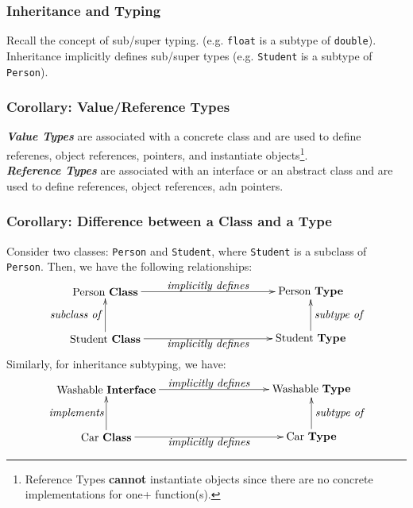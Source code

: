 \documentclass{article}
\begin{document}
\subsubsection{Inheritance and Typing}
Recall the concept of sub/super typing. (e.g. \texttt{float} is a
subtype of \texttt{double}). Inheritance implicitly defines sub/super
types (e.g. \texttt{Student} is a subtype of \texttt{Person}).

\subsubsection*{Corollary: Value/Reference Types}
\textit{\textbf{Value Types}} are associated with a concrete class and
are used to define referenes, object references, pointers, and
instantiate objects\footnote{Reference Types \textbf{cannot}
  instantiate objects since there are no concrete implementations for one+
  function(s).}. \\
\textit{\textbf{Reference Types}} are associated with an interface or
an abstract class and are used to define references, object
references, adn pointers.

\subsubsection*{Corollary: Difference between a Class and a Type}
Consider two classes: \texttt{Person} and \texttt{Student}, where
\texttt{Student} is a subclass of \texttt{Person}. Then, we have the
following relationships: \\
\[
  \begin{xy}
    (0,15)*+{\text{Person \textbf{Class}}}="a"; 
    (65, 15)*+{\text{Person \textbf{Type}}}="b";
    (0, 0)*+{\text{Student \textbf{Class}}}="c";
    (65, 0)*+{\text{Student \textbf{Type}}}="d";
    {\ar         "a";"b"}?*!/_5pt/{\textit{implicitly defines}};
    {\ar         "c";"a"}?*!/_27pt/{\textit{subclass of}};
    {\ar         "d";"b"}?*!/^25pt/{\textit{subtype of}};
    {\ar         "c";"d"}?*!/^5pt/{\textit{implicitly defines}};
  \end{xy}
\]
Similarly, for inheritance subtyping, we have: \\
\[
  \begin{xy}
    (0,15)*+{\text{Washable \textbf{Interface}}}="a"; 
    (65, 15)*+{\text{Washable \textbf{Type}}}="b";
    (0, 0)*+{\text{Car \textbf{Class}}}="c";
    (65, 0)*+{\text{Car \textbf{Type}}}="d";
    {\ar         "a";"b"}?*!/_5pt/{\textit{implicitly defines}};
    {\ar         "c";"a"}?*!/_27pt/{\textit{implements}};
    {\ar         "d";"b"}?*!/^25pt/{\textit{subtype of}};
    {\ar         "c";"d"}?*!/^5pt/{\textit{implicitly defines}};
  \end{xy}
\]
\end{document}
